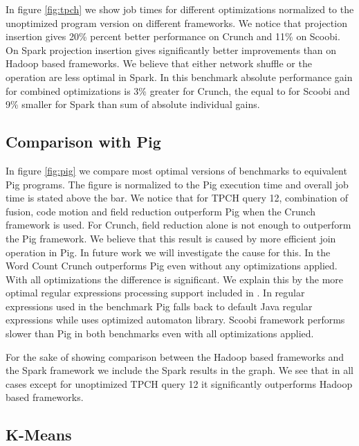 In figure \ref{fig:tpch} we show job times for different optimizations normalized to the unoptimized program version on different frameworks. We notice that projection insertion gives 20\% percent better performance on Crunch and 11\% on Scoobi. On Spark projection insertion gives significantly better improvements than on Hadoop based frameworks. We believe that either network shuffle or the  operation are less optimal in Spark. In this benchmark absolute performance gain for combined optimizations is 3\% greater for Crunch, the equal to for Scoobi and 9\% smaller for Spark than sum of absolute individual gains. 

\subsection{Comparison with Pig}
\label{subsec:pig}

In figure \ref{fig:pig} we compare most optimal versions of benchmarks to equivalent Pig programs. The figure is normalized to the Pig execution time and overall job time is stated above the bar. We notice that for TPCH query 12, combination of fusion, code motion and field reduction outperform Pig when the Crunch framework is used. For Crunch, field reduction alone is not enough to outperform the Pig framework. We believe that this result is caused by more efficient join operation in Pig. In future work we will investigate the cause for this.
In the Word Count Crunch outperforms Pig even without any optimizations applied. With all optimizations the difference is significant. We explain this by the more optimal regular expressions processing support included in \tool. In regular expressions used in the benchmark Pig falls back to default Java regular expressions while \tool uses optimized automaton library. Scoobi framework performs slower than Pig in both benchmarks even with all optimizations applied.

For the sake of showing comparison between the Hadoop based frameworks and the Spark framework we include the Spark results in the graph. We see that in all cases except for unoptimized TPCH query 12 it significantly outperforms Hadoop based frameworks.

\subsection{K-Means}
\label{subsec:kmeans}

